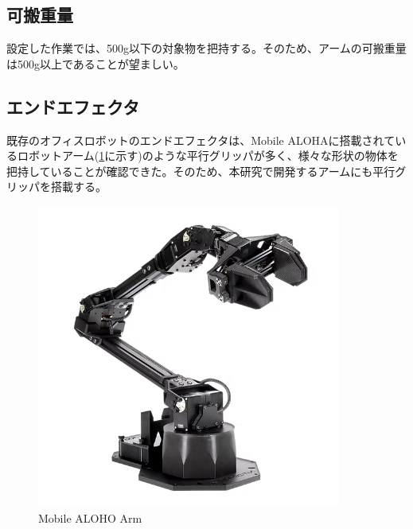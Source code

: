 \subsection{可搬重量}
設定した作業では、500g以下の対象物を把持する。そのため、アームの可搬重量は500g以上であることが望ましい。
\subsection{エンドエフェクタ}
既存のオフィスロボットのエンドエフェクタは、Mobile ALOHAに搭載されているロボットアーム(\ref{fig:alohaarm}に示す)のような平行グリッパが多く、様々な形状の物体を把持していることが確認できた。そのため、本研究で開発するアームにも平行グリッパを搭載する。

\begin{figure}[h]
  \centering
  \includegraphics[width=10cm]{images/alohaarm.png}
  \caption{Mobile ALOHO Arm}
  \label{fig:alohaarm}
\end{figure}

\newpage